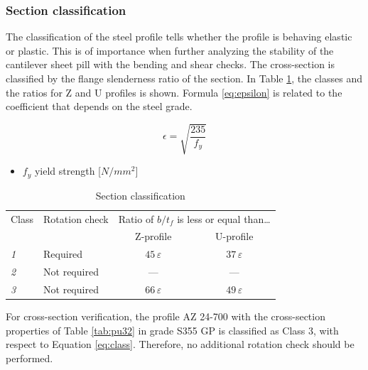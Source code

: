 \subsubsection{Section classification}

The classification of the steel profile tells whether the profile is behaving elastic or plastic. This is of importance when further analyzing the stability of the cantilever sheet pill with the bending and shear checks. The cross-section is classified by the flange slenderness ratio of the section. In Table \ref{tab:section_classification}, the classes and the ratios for Z and U profiles is shown. Formula \ref{eq:epsilon} is related to the coefficient that depends on the steel grade. 

\begin{equation}
    \epsilon = \sqrt{\frac{235}{f_{y}}}
    \label{eq:epsilon}
\end{equation}

\begin{itemize}
    \item $f_{y}$   yield strength [$N/mm^{2}$]
\end{itemize}

\begin{table}[H]
  \centering
  \small
  \setlength{\tabcolsep}{8pt}
  \renewcommand{\arraystretch}{1.15}
  \caption{Section classification}
  \label{tab:section_classification}
  \begin{tabular}{@{}l l c c@{}}
    \toprule
    \multicolumn{1}{l}{Class} &
    \multicolumn{1}{l}{Rotation check} &
    \multicolumn{2}{c}{Ratio of $b/t_f$ is less or equal than\ldots} \\
    \cmidrule(lr){3-4}
    & & Z-profile & U-profile \\
    \midrule
    \textit{1} & Required     & $45\,\varepsilon$ & $37\,\varepsilon$ \\
    \textit{2} & Not required & ---               & ---               \\
    \textit{3} & Not required & $66\,\varepsilon$ & $49\,\varepsilon$ \\
    \bottomrule
  \end{tabular}
\end{table}

For cross-section verification, the profile AZ 24-700 with the cross-section properties of Table \ref{tab:pu32} in grade S355 GP is classified as Class 3, with respect to Equation \ref{eq:class}. Therefore, no additional rotation check should be performed.

